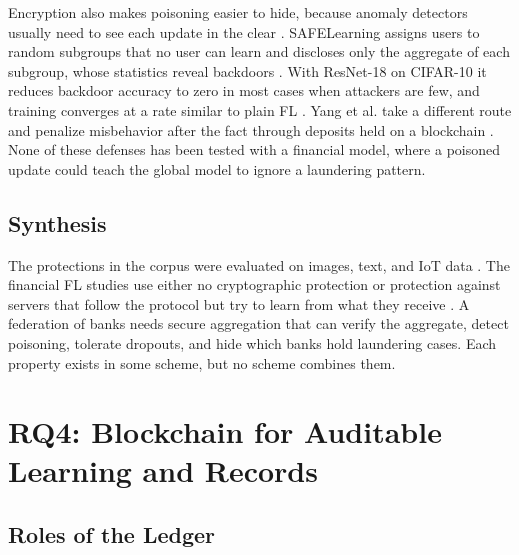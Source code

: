 \documentclass[journal]{IEEEtran}
\begin{document}
Encryption also makes poisoning easier to hide, because anomaly detectors usually need to see each update in the clear \cite{zhang2023safelearning}. SAFELearning assigns users to random subgroups that no user can learn and discloses only the aggregate of each subgroup, whose statistics reveal backdoors \cite{zhang2023safelearning}. With ResNet-18 on CIFAR-10 it reduces backdoor accuracy to zero in most cases when attackers are few, and training converges at a rate similar to plain FL \cite{zhang2023safelearning}. Yang et al. take a different route and penalize misbehavior after the fact through deposits held on a blockchain \cite{yang2022accountable}. None of these defenses has been tested with a financial model, where a poisoned update could teach the global model to ignore a laundering pattern.

\subsection{Synthesis}

The protections in the corpus were evaluated on images, text, and IoT data \cite{yang2022accountable,zhang2023safelearning,gao2023category,sami2024tinysecagg,wang2023vosa}. The financial FL studies use either no cryptographic protection \cite{tang2024sdt,awosika2024xai} or protection against servers that follow the protocol but try to learn from what they receive \cite{li2026plc}. A federation of banks needs secure aggregation that can verify the aggregate, detect poisoning, tolerate dropouts, and hide which banks hold laundering cases. Each property exists in some scheme, but no scheme combines them.

\section{RQ4: Blockchain for Auditable Learning and Records}
\label{sec:rq4}

\subsection{Roles of the Ledger}
\end{document}
